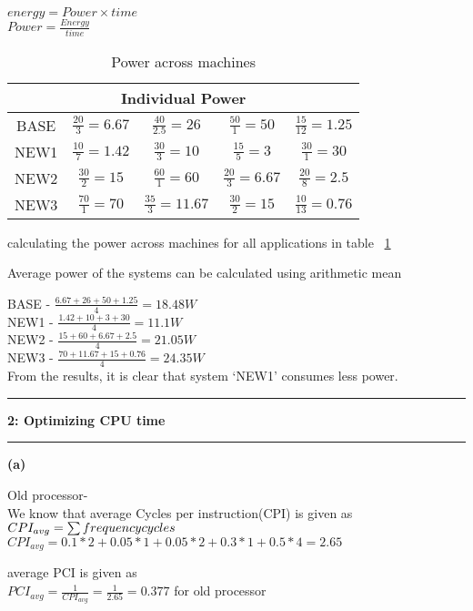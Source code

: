 \documentclass[11pt]{article}
\newcommand\question[2]{\vspace{.25in}\hrule\textbf{#1: #2}\vspace{.5em}\hrule\vspace{.10in}}
\renewcommand\part[1]{\vspace{.10in}\textbf{(#1)}}
\begin{document}
$energy = Power \times time$\\
$Power = \frac{Energy}{time}$

\begin{table}[h]
\centering
\label{powerTable}
\caption{Power across machines}
\begin{tabular}{|c|c|c|c|c|}
 \hline
 \multicolumn{5}{|c|}{Individual Power}\\
 \hline
 BASE&$\frac{20}{3}=6.67$&$\frac{40}{2.5}=26$&$\frac{50}{1}=50$&$\frac{15}{12}=1.25$\\
 \hline
 NEW1&$\frac{10}{7}=1.42$&$\frac{30}{3}=10$&$\frac{15}{5}=3$&$\frac{30}{1}=30$\\
 \hline
 NEW2&$\frac{30}{2}=15$&$\frac{60}{1}=60$&$\frac{20}{3}=6.67$&$\frac{20}{8}=2.5$\\
 \hline
 NEW3&$\frac{70}{1}=70$&$\frac{35}{3}=11.67$&$\frac{30}{2}=15$&$\frac{10}{13}=0.76$\\
 \hline
\end{tabular}
\end{table}

calculating the power across machines for all applications in table ~\ref{powerTable}

Average power of the systems can be calculated using arithmetic mean

BASE  - $\frac{6.67+26+50+1.25}{4} = 18.48W$\\
NEW1  - $\frac{1.42+10+3+30}{4} = 11.1W$\\
NEW2  - $\frac{15+60+6.67+2.5}{4} = 21.05W$\\
NEW3  - $\frac{70+11.67+15+0.76}{4} = 24.35W$\\

From the results, it is clear that system `NEW1' consumes less power.

\question{2}{Optimizing CPU time}

\part{a}

Old processor-\\
We know that average Cycles per instruction(CPI) is given as \\
$CPI_{avg} = \sum frequency\* cycles$\\
$CPI_{avg} = 0.1*2+0.05*1+0.05*2+0.3*1+0.5*4 = 2.65$

average PCI is given as\\
$PCI_{avg}=\frac{1}{CPI_{avg}} = \frac{1}{2.65} = 0.377$ for old processor
\end{document}
